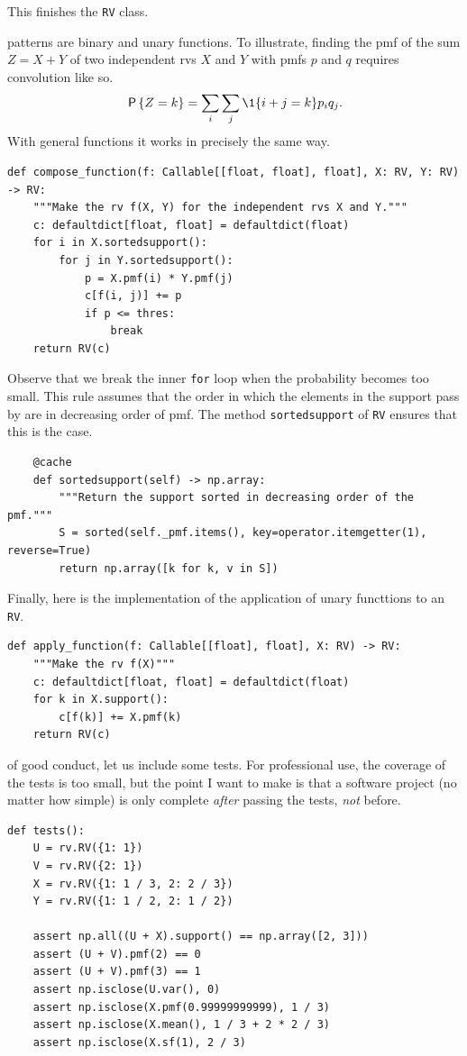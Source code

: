 \documentclass[queueing-book]{subfiles}
\begin{document}
This finishes the \texttt{RV} class.

 patterns are binary and unary functions.
To illustrate, finding the pmf of the sum \(Z=X+Y\) of two independent rvs \(X\) and \(Y\) with pmfs \(p\) and \(q\) requires convolution like so.
\begin{equation*}
\P{Z=k} = \sum_{i}\sum_j \1{i+j=k} p_i q_{j}.
\end{equation*}
With general functions it works in precisely the same way.
\begin{verbatim}
def compose_function(f: Callable[[float, float], float], X: RV, Y: RV) -> RV:
    """Make the rv f(X, Y) for the independent rvs X and Y."""
    c: defaultdict[float, float] = defaultdict(float)
    for i in X.sortedsupport():
        for j in Y.sortedsupport():
            p = X.pmf(i) * Y.pmf(j)
            c[f(i, j)] += p
            if p <= thres:
                break
    return RV(c)
\end{verbatim}

Observe that we break the inner \texttt{for} loop when the probability becomes too small.
This rule assumes that the order in which the elements in the support pass by are in decreasing order of pmf.
The method \texttt{sortedsupport} of \texttt{RV} ensures that this is the case.

\begin{verbatim}
    @cache
    def sortedsupport(self) -> np.array:
        """Return the support sorted in decreasing order of the pmf."""
        S = sorted(self._pmf.items(), key=operator.itemgetter(1), reverse=True)
        return np.array([k for k, v in S])
\end{verbatim}

Finally, here is the implementation of the application of unary functtions to an \texttt{RV}.
\begin{verbatim}
def apply_function(f: Callable[[float], float], X: RV) -> RV:
    """Make the rv f(X)"""
    c: defaultdict[float, float] = defaultdict(float)
    for k in X.support():
        c[f(k)] += X.pmf(k)
    return RV(c)
\end{verbatim}

 of good conduct, let us include some tests.
For professional use, the coverage of the tests is too small, but the point I want to make is that a software project (no matter how simple) is only complete \emph{after}  passing the tests, \emph{not} before.
\begin{verbatim}
def tests():
    U = rv.RV({1: 1})
    V = rv.RV({2: 1})
    X = rv.RV({1: 1 / 3, 2: 2 / 3})
    Y = rv.RV({1: 1 / 2, 2: 1 / 2})

    assert np.all((U + X).support() == np.array([2, 3]))
    assert (U + V).pmf(2) == 0
    assert (U + V).pmf(3) == 1
    assert np.isclose(U.var(), 0)
    assert np.isclose(X.pmf(0.99999999999), 1 / 3)
    assert np.isclose(X.mean(), 1 / 3 + 2 * 2 / 3)
    assert np.isclose(X.sf(1), 2 / 3)
\end{verbatim}
\end{document}
